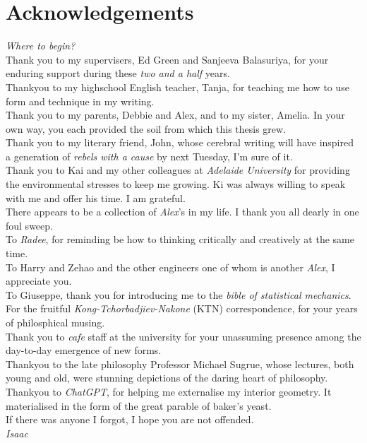 \chapter{Acknowledgements}

\textit{Where to begin?}
\\
Thank you to my supervisers, Ed Green and Sanjeeva Balasuriya,
for your enduring support during these \textit{two and a half} 
years.
\\
Thankyou to my highschool English teacher, Tanja, for teaching
me how to use form and technique in my writing.
\\
Thank you to my parents, Debbie and Alex, and to my sister,
Amelia. In your own way, you each provided the soil 
from which this thesis grew.
\\
Thank you to my literary friend, John, whose cerebral writing 
will have inspired a generation of \textit{rebels with a cause} by 
next Tuesday, I'm sure of it.
\\
Thank you to Kai and my other colleagues at \textit{Adelaide University}
for providing the environmental stresses to keep me growing. Ki 
was always willing to speak with me and offer his time. 
I am grateful.
\\
There appears to be a collection of \textit{Alex}'s in my life.
I thank you all dearly in one foul sweep. 
\\
To \textit{Radee}, for reminding be how to thinking critically 
and creatively at the same time.
\\
To Harry and Zehao and the other engineers one of whom is another \textit{Alex},
I appreciate you.
\\
To Giuseppe, thank you for introducing me to the \textit{bible of statistical mechanics}.
\\
For the fruitful \textit{Kong-Tchorbadjiev-Nakone} (KTN) correspondence,
for your years of philosphical musing.
\\
Thank you to \textit{cafe} staff at the university for your 
unassuming presence among the day-to-day emergence of new forms.
\\
Thankyou to the late philosophy Professor Michael Sugrue,
whose lectures, both young and old, were stunning depictions
of the daring heart of philosophy.
\\
Thankyou to \textit{ChatGPT},
for helping me externalise my interior geometry.
It materialised in the form of the great parable of baker's yeast.
\\
If there was anyone I forgot, I hope you are not offended.
\\

\textit{Isaac}
